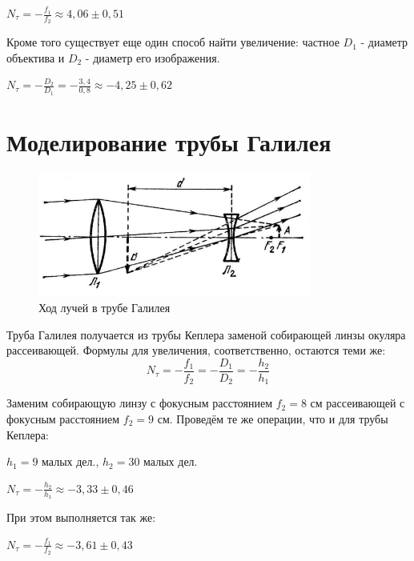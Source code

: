 \begin{center}
    $N_{\tau} = -\frac{f_{1}}{f_2} \approx 4,06 \pm 0,51$
\end{center}

Кроме того существует еще один способ найти увеличение: частное $D_1 $ - диаметр объектива и $D_2$ - диаметр его изображения.

\begin{center}
	$N_{\tau} = -\frac{D_2}{D_1} = -\frac{3,4}{0,8} \approx -4,25 \pm 0,62$
\end{center}



\section{Моделирование трубы Галилея}
    \begin{figure}[h!]
    \centering
    \includegraphics[width=9cm]{pics/gal.png}
    \caption{Ход лучей в трубе Галилея}
    \label{}
\end{figure}

Труба Галилея получается из трубы Кеплера заменой собирающей линзы окуляра рассеивающей. Формулы для увеличения, соответственно, остаются теми же:
\begin{equation}
    N_{\tau} = -\frac{f_1}{f_2} = -\frac{D_1}{D_2} =  -\frac{h_2}{h_1}
\end{equation}


Заменим собирающую линзу с фокусным расстоянием $f_2 = 8$ см рассеивающей с фокусным расстоянием $f_2 = 9$ см. Проведём те же операции, что и для трубы Кеплера:

\begin{center}
$h_1 = 9$ малых дел., \hspace{1cm} $h_2 = 30$ малых дел. \par
$N_{\tau} = -\frac{h_2}{h_1} \approx -3,33 \pm 0,46$
\end{center}

При этом выполняется так же:

\begin{center}
    $N_{\tau} = -\frac{f_1}{f_2} \approx -3,61 \pm 0,43$
\end{center}

